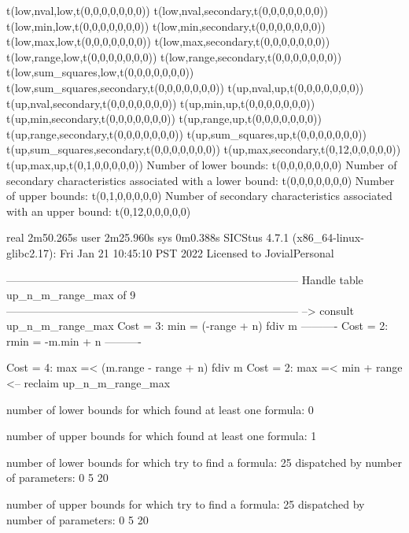 t(low,nval,low,t(0,0,0,0,0,0,0))
t(low,nval,secondary,t(0,0,0,0,0,0,0))
t(low,min,low,t(0,0,0,0,0,0,0))
t(low,min,secondary,t(0,0,0,0,0,0,0))
t(low,max,low,t(0,0,0,0,0,0,0))
t(low,max,secondary,t(0,0,0,0,0,0,0))
t(low,range,low,t(0,0,0,0,0,0,0))
t(low,range,secondary,t(0,0,0,0,0,0,0))
t(low,sum_squares,low,t(0,0,0,0,0,0,0))
t(low,sum_squares,secondary,t(0,0,0,0,0,0,0))
t(up,nval,up,t(0,0,0,0,0,0,0))
t(up,nval,secondary,t(0,0,0,0,0,0,0))
t(up,min,up,t(0,0,0,0,0,0,0))
t(up,min,secondary,t(0,0,0,0,0,0,0))
t(up,range,up,t(0,0,0,0,0,0,0))
t(up,range,secondary,t(0,0,0,0,0,0,0))
t(up,sum_squares,up,t(0,0,0,0,0,0,0))
t(up,sum_squares,secondary,t(0,0,0,0,0,0,0))
t(up,max,secondary,t(0,12,0,0,0,0,0))
t(up,max,up,t(0,1,0,0,0,0,0))
Number of lower bounds:                                             t(0,0,0,0,0,0,0)
Number of secondary characteristics associated with a lower bound:  t(0,0,0,0,0,0,0)
Number of upper bounds:                                             t(0,1,0,0,0,0,0)
Number of secondary characteristics associated with an upper bound: t(0,12,0,0,0,0,0)

real	2m50.265s
user	2m25.960s
sys	0m0.388s
SICStus 4.7.1 (x86_64-linux-glibc2.17): Fri Jan 21 10:45:10 PST 2022
Licensed to JovialPersonal


--------------------------------------------------------------------------------
Handle table up_n_m_range_max of 9
--------------------------------------------------------------------------------
--> consult up_n_m_range_max
Cost =  3:  min  = (-range + n) fdiv m
----------
Cost =  2:  rmin = -m.min + n
----------

Cost =  4:  max =< (m.range - range + n) fdiv m
Cost =  2:  max =< min + range
<-- reclaim up_n_m_range_max

number of lower bounds for which found at least one formula: 0

number of upper bounds for which found at least one formula: 1

number of lower bounds for which try to find a formula: 25
dispatched by number of parameters: 0  5  20

number of upper bounds for which try to find a formula: 25
dispatched by number of parameters: 0  5  20

